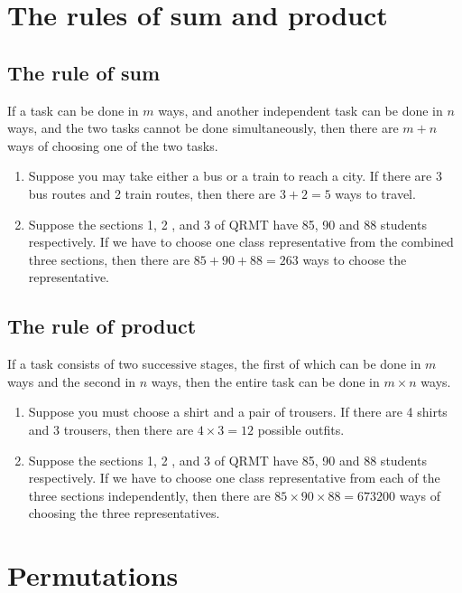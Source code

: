 \section{The rules of sum and product}

\subsection{The rule of sum}
If a task can be done in $m$ ways, and another independent task can be
done in $n$ ways, and the two tasks cannot be done simultaneously,
then there are $m+n$ ways of choosing one of the two tasks.

\begin{example} 
\begin{enumerate}
\item Suppose you may take either a bus or a train to reach a city. If there
are 3 bus routes and 2 train routes, then there are $3+2=5$ ways to
travel.
\item Suppose the sections 1, 2 , and 3 of QRMT have 85, 90 and 88 students respectively. If we have to choose one class representative from the combined three sections, then there are $85 + 90 + 88 = 263$ ways
to choose the representative.
\end{enumerate}
\end{example}

\subsection{The rule of product}
If a task consists of two successive stages, the first of which can be
done in $m$ ways and the second in $n$ ways, then the entire task can
be done in $m \times n$ ways.

\begin{example}  
\begin{enumerate}
\item Suppose you must choose a shirt and a pair of trousers. If there are
4 shirts and 3 trousers, then there are $4 \times 3 = 12$ possible
outfits.
\item Suppose the sections 1, 2 , and 3 of QRMT have 85, 90 and 88 students respectively. If we have to choose one class representative from each of the three sections independently, then there are
$85 \times 90 \times 88 = 673200$ ways of choosing the three representatives.
\end{enumerate}
\end{example}

\section{Permutations}

